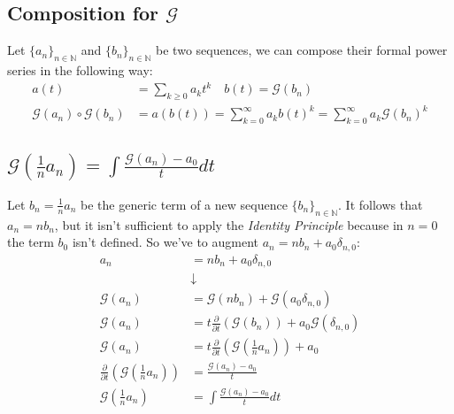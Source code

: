 \subsection{Composition for $\mathcal{G} $}

Let $\{a_n\}_{n\in\mathbb{N} } $ and $\{b_n\}_{n\in\mathbb{N} } $ be
two sequences, we can compose their formal power series in the
following way:
\begin{displaymath}
  \begin{split}
    a(t) &= \sum_{k\geq 0}{a_k t^k} \quad b(t)= \mathcal{G} (b_n) \\
    \mathcal{G} (a_n) \circ \mathcal{G}(b_n) &= a(b(t)) =
    \sum_{k=0}^{\infty}{a_k b(t)^k}=
    \sum_{k=0}^{\infty}{a_k \mathcal{G} (b_n)^k}
  \end{split}
\end{displaymath}

\subsection{$\mathcal{G} ( \frac{1}{n} a_n) = \int{ \frac{\mathcal{G}
      (a_n) - a_0}{t}dt }$}

Let $b_n = \frac{1}{n} a_n$ be the generic term of a new sequence
$\{b_n\}_{n\in\mathbb{N} } $. It follows that $a_n = n b_n$, but it
isn't sufficient to apply the \emph{Identity Principle} because in
$n=0$ the term $b_0$ isn't defined. So we've to augment $a_n = n b_n +
a_0\delta_{n,0}$:
\begin{displaymath}
  \begin{split}
    a_n &= n b_n + a_0\delta_{n,0} \\
    &\downarrow \\
    \mathcal{G} (a_n) &= \mathcal{G} (n b_n) + \mathcal{G}
    (a_0\delta_{n,0})\\
    \mathcal{G} (a_n) &= t \frac{\partial}{\partial t}\left(
      \mathcal{G} ( b_n) \right) + a_0\mathcal{G} (\delta_{n,0})\\
    \mathcal{G} (a_n) &= t \frac{\partial}{\partial t}\left(
      \mathcal{G} ( \frac{1}{n} a_n) \right) + a_0\\
    \frac{\partial}{\partial t}\left( \mathcal{G} ( \frac{1}{n} a_n)
    \right) &= \frac{\mathcal{G} (a_n) - a_0}{t}\\
    \mathcal{G} ( \frac{1}{n} a_n) &=\int{ \frac{\mathcal{G} (a_n) -
        a_0}{t}dt}
  \end{split}
\end{displaymath}

